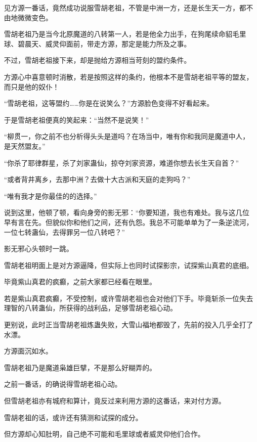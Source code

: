 
\begin{this_body}

见方源一番话，竟然成功说服雪胡老祖，不管是中洲一方，还是长生天一方，都不由地微微变色。

雪胡老祖乃是当今北原魔道的八转第一人，若是他全力出手，在狗尾续命貂毛里球、碧晨天、威灵仰面前，带走方源，那定是能力所及之事。

不过，雪胡老祖接下来，却是抛给方源相当苛刻的盟约条件。

方源心中喜意顿时消散，若是按照这样的条约，他根本不是雪胡老祖平等的盟友，而只是他的奴仆！

“雪胡老祖，这等盟约……你是在说笑么？”方源脸色变得不好看起来。

于是雪胡老祖便真的笑起来：“当然不是说笑！”

“柳贯一，你之前不也分析得头头是道吗？在场当中，唯有你和我同是魔道中人，是天然盟友。”

“你杀了耶律群星，杀了刘家蛊仙，掠夺刘家资源，难道你想去长生天自首？”

“或者背井离乡，去那中洲？去做十大古派和天庭的走狗吗？”

“唯有我才是你最佳的的选择。”

说到这里，他顿了顿，看向身旁的影无邪：“你要知道，我也有难处。我与这几位早有言在先。但貌似你和他们之间，还有仇怨。我总不可能单单为了一条逆流河，一位七转蛊仙，去得罪另一位八转吧？”

影无邪心头顿时一跳。

雪胡老祖明面上是对方源逼降，但实际上也同时试探影宗，试探紫山真君的底细。

毕竟紫山真君的疯癫，之前大家都已经看在眼里。

若是紫山真君疯癫，不受控制，或许雪胡老祖也会对他们下手。毕竟斩杀一位失去理智的八转蛊仙，所获得的战利品，足够雪胡老祖心动。

更别说，此时正当雪胡老祖炼蛊失败，大雪山福地都毁了，先前的投入几乎全打了水漂。

方源面沉如水。

雪胡老祖乃是魔道枭雄巨擘，不是那么好糊弄的。

之前一番话，的确说得雪胡老祖心动。

但雪胡老祖亦有城府和算计，竟反过来利用方源的这番话，来对付方源。

雪胡老祖的话，或许还有猜测和试探的成分。

但方源却心知肚明，自己绝不可能和毛里球或者威灵仰他们合作。


\end{this_body}
